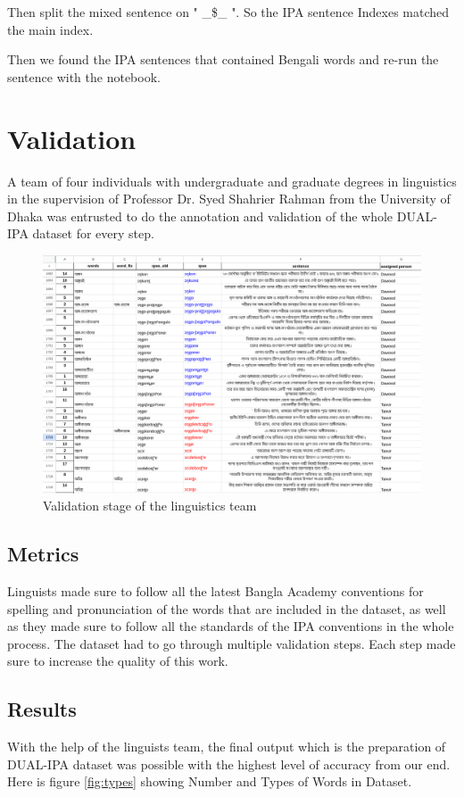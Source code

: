 Then split the mixed sentence on " \_\$\_ ". So the IPA sentence Indexes matched the main index.

Then we found the IPA sentences that contained Bengali words and re-run the sentence with the notebook.

\newpage
\section{Validation}
A team of four individuals with undergraduate and graduate degrees
in linguistics in the supervision of Professor Dr. Syed Shahrier Rahman from the University of Dhaka was entrusted to do the annotation and validation of the whole DUAL-IPA dataset for every step.
\vspace{1cm}
 \begin{figure}[htbp]
    \centering
    \includegraphics[width=\textwidth]{Images/Screenshot/unique_words.png}
    \caption{Validation stage of the linguistics team}
    \label{fig:unique_words}
\end{figure} 



\subsection{Metrics}
Linguists made sure to follow all the latest Bangla Academy conventions for spelling and pronunciation of the words that are included in the dataset, as well as they made sure to follow all the standards of the IPA conventions in the whole process. The dataset had to go through multiple validation steps. Each step made sure to increase the quality of this work.
\newpage
\subsection{Results}
With the help of the linguists team, the final output which is the preparation of DUAL-IPA dataset was possible with the highest level of accuracy from our end. Here is figure \ref{fig:types} showing Number and Types of Words in Dataset.


